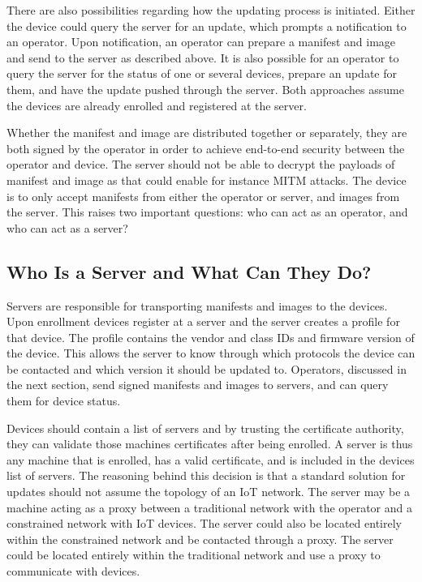 \documentclass[0-thesis.tex]{subfiles}
\begin{document}
There are also possibilities regarding how the updating process is initiated. Either the
device could query the server for an update, which prompts a notification to an operator.
Upon notification, an operator can prepare a manifest and image and send to the server as
described above. It is also possible for an operator to query the server for the status of
one or several devices, prepare an update for them, and have the update pushed through the
server. Both approaches assume the devices are already enrolled and registered at the
server.

Whether the manifest and image are distributed together or separately, they are both
signed by the operator in order to achieve end-to-end security between the operator and
device. The server should not be able to decrypt the payloads of manifest and image as
that could enable for instance MITM attacks. The device is to only accept manifests from
either the operator or server, and images from the server. This raises two important
questions: who can act as an operator, and who can act as a server?

\subsection{Who Is a Server and What Can They Do?}
\label{ssec:who-is-a-server}
Servers are responsible for transporting manifests and images to the devices. Upon
enrollment devices register at a server and the server creates a profile for that device.
The profile contains the vendor and class IDs and firmware version of the device. This
allows the server to know through which protocols the device can be contacted and which
version it should be updated to. Operators, discussed in the next section, send signed
manifests and images to servers, and can query them for device status.

Devices should contain a list of servers and by trusting the certificate authority, they
can validate those machines certificates after being enrolled. A server is thus any
machine that is enrolled, has a valid certificate, and is included in the devices list of
servers. The reasoning behind this decision is that a standard solution for updates should
not assume the topology of an IoT network. The server may be a machine acting as a proxy
between a traditional network with the operator and a constrained network with IoT
devices. The server could also be located entirely within the constrained network and be
contacted through a proxy. The server could be located entirely within the traditional
network and use a proxy to communicate with devices. 
\end{document}
